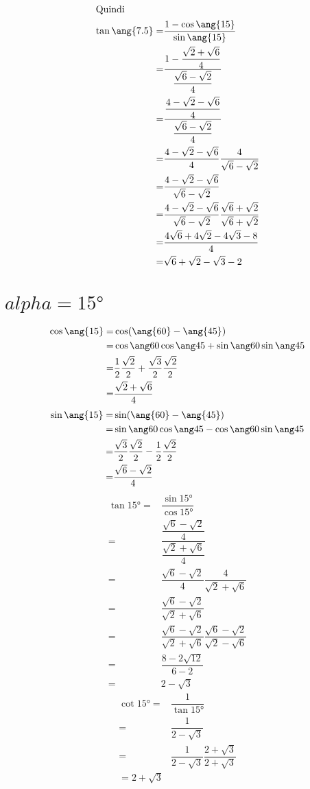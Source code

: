 \begin{align*}
	\intertext{Quindi}
	\tan\ang{7.5}=&\dfrac{1-\cos\ang{15}}{\sin\ang{15}}\\
	=&\dfrac{1-\dfrac{\sqrt{2}+\sqrt{6}}{4}}{\dfrac{\sqrt{6}-\sqrt{2}}{4}}\\
	=&\dfrac{\dfrac{4-\sqrt{2}-\sqrt{6}}{4}}{\dfrac{\sqrt{6}-\sqrt{2}}{4}}\\
	=&\dfrac{4-\sqrt{2}-\sqrt{6}}{4}\dfrac{4}{\sqrt{6}-\sqrt{2}}\\
	=&\dfrac{4-\sqrt{2}-\sqrt{6}}{\sqrt{6}-\sqrt{2}}\\
	=&\dfrac{4-\sqrt{2}-\sqrt{6}}{\sqrt{6}-\sqrt{2}}\dfrac{\sqrt{6}+\sqrt{2}}{\sqrt{6}+\sqrt{2}}\\
	=&\dfrac{4\sqrt{6}+4\sqrt{2}-4\sqrt{3}-8}{4}\\
	=&\sqrt{6}+\sqrt{2}-\sqrt{3}-2
\end{align*}
\section{$alpha=\ang{15}$}
\begin{align*}
	\cos\ang{15}=&\cos(\ang{60}-\ang{45})\\
	=&\difcos{60}{45}\\
	=&\cossessanta\cosquarantacinque+\sinsessanta\sinquarantecinque\\
	=&\dfrac{\sqrt{2}+\sqrt{6}}{4}\\
\end{align*}
\begin{align*}
	\sin\ang{15}=&\sin(\ang{60}-\ang{45})\\
	=&\difsin{60}{45}\\
	=&\sinsessanta\cosquarantacinque-\cossessanta\sinquarantecinque\\
	=&\dfrac{\sqrt{6}-\sqrt{2}}{4}
\end{align*}
\begin{align*}
	\tan\ang{15}=&\dfrac{\sin\ang{15}}{\cos\ang{15}}\\
	=&\dfrac{\dfrac{\sqrt{6}-\sqrt{2}}{4}}{\dfrac{\sqrt{2}+\sqrt{6}}{4}}\\
	=&\dfrac{\sqrt{6}-\sqrt{2}}{4}\dfrac{4}{\sqrt{2}+\sqrt{6}}\\
	=&\dfrac{\sqrt{6}-\sqrt{2}}{\sqrt{2}+\sqrt{6}}\\
	=&\dfrac{\sqrt{6}-\sqrt{2}}{\sqrt{2}+\sqrt{6}}\dfrac{\sqrt{6}-\sqrt{2}}{\sqrt{2}-\sqrt{6}}\\
	=&\dfrac{8-2\sqrt{12}}{6-2}\\
	=&2-\sqrt{3}
\end{align*}
\begin{align*}
	\cot\ang{15}=&\dfrac{1}{\tan\ang{15}}\\
	=&\dfrac{1}{2-\sqrt{3}}\\
	=&\dfrac{1}{2-\sqrt{3}}\dfrac{2+\sqrt{3}}{2+\sqrt{3}}\\
	=2+\sqrt{3}\\
\end{align*}
